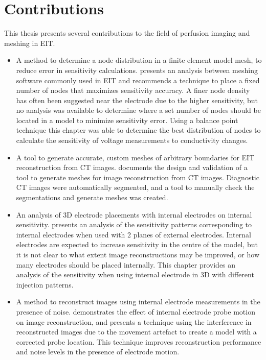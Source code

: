 \section{Contributions}
This thesis presents several contributions to the field of perfusion imaging and 
meshing in EIT.
\begin{itemize}
	\item A method to determine a node distribution in a finite element model mesh,
        to reduce error in sensitivity calculations.  presents an 
        analysis between meshing software commonly used in EIT and recommends a technique to 
        place a fixed number of nodes that maximizes sensitivity accuracy. 
        A finer node density has often been suggested near the electrode due to the higher 
        sensitivity, but no analysis was available to determine where a set number of
        nodes should be located in a model to minimize sensitivity error. 
        Using a balance point 
        technique this chapter was able to determine the best distribution of nodes
        to calculate the sensitivity of voltage measurements to conductivity changes.
	\item A tool to generate accurate, custom meshes of arbitrary boundaries for EIT reconstruction from 
        CT images.  documents 
        the design and validation of a tool to generate meshes for image reconstruction from CT images. 
        Diagnostic CT images were automatically segmented, and a tool to manually check the segmentations
        and generate meshes was created. 
	\item An analysis of 3D electrode placements with internal electrodes on internal sensitivity. 
         presents an analysis of the sensitivity patterns corresponding to 
        internal electrodes when used with 2 planes of external electrodes. Internal electrodes are
        expected to increase sensitivity in the centre of the model, but it is not clear to what extent 
        image reconstructions may be improved, or how many electrodes should be 
        placed internally. This chapter provides an analysis of the sensitivity when using internal
        electrode in 3D with different injection patterns.  
	\item A method to reconstruct images using internal electrode measurements in the presence of noise.
         demonstrates the effect of internal electrode probe motion on image 
        reconstruction, and presents a technique using the interference in reconstructed images 
        due to the movement artefact to create a model with a corrected probe location. This technique
        improves reconstruction performance and noise levels in the presence of electrode motion.
\end{itemize}

